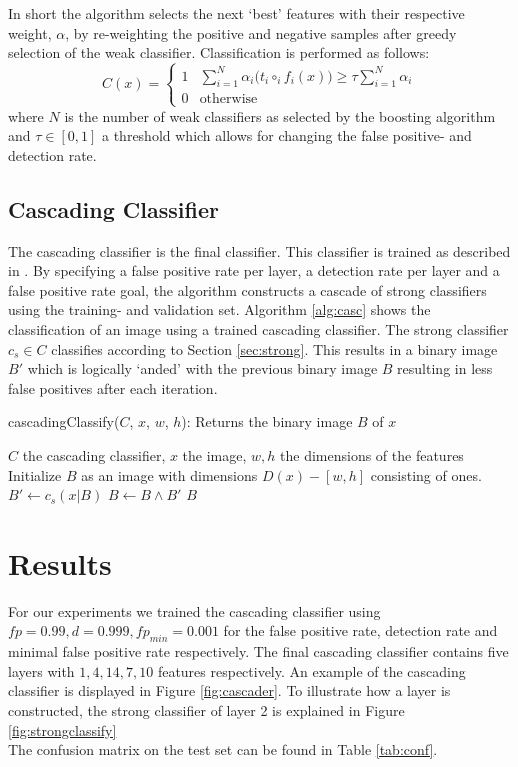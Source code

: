 \documentclass[a4paper,11pt]{article}
\begin{document}
In short the algorithm selects the next `best' features with their respective
weight, $\alpha$,  by re-weighting the positive and negative samples after
greedy selection of the weak classifier.
Classification is performed as follows:
\begin{displaymath}
C(x) = 
	\left\{ \begin{array}{ll}
		1 & \sum^N_{i=1} \alpha_i \big(t_i \circ_i f_i(x)\big) \ge \tau \sum^N_{i=1}\alpha_i \\
		0 & \textrm{otherwise}
	\end{array} \right.
\end{displaymath}
where $N$ is the number of weak classifiers as selected by the boosting
algorithm and $\tau \in [0,1]$ a threshold which allows for changing the false
positive- and detection rate.

\subsection{Cascading Classifier} \label{sec:casc}
The cascading classifier is the final classifier. This classifier is trained as
described in \cite{viola}. By specifying a false positive rate per layer, a
detection rate per layer and a false positive rate goal, the algorithm
constructs a cascade of strong classifiers using the training- and validation
set.  Algorithm \ref{alg:casc} shows the classification of an image using a
trained cascading classifier. The strong classifier $c_s \in C$ classifies
according to Section \ref{sec:strong}. This results in a binary image $B'$
which is logically `anded' with the previous binary image $B$ resulting in less
false positives after each iteration.
\begin{algorithm}[!htb]
	\caption{cascadingClassify($C$, $x$, $w$, $h$): Returns the binary image $B$ of $x$}
	\begin{algorithmic}[1]
	\REQUIRE $C$ the cascading classifier, $x$ the image, $w,h$ the dimensions of the features
	\medskip
	\STATE Initialize $B$ as an image with dimensions $D(x) - [w,h]$ consisting of ones.
		\STATE $B' \leftarrow c_s(x|B)$
		\STATE $B \leftarrow B \land B'$
	\ENDFOR
	\RETURN $B$
	\end{algorithmic}
\label{alg:casc}
\end{algorithm}

\section{Results} \label{sec:res}
For our experiments we trained the cascading classifier using $fp = 0.99, d =
0.999, fp_{min} = 0.001$ for the false positive rate, detection rate and
minimal false positive rate respectively. The final cascading classifier
contains five layers with $1, 4, 14, 7, 10$ features respectively. An example
of the cascading classifier is displayed in Figure \ref{fig:cascader}. To
illustrate how a layer is constructed, the strong classifier of layer 2 is
explained in Figure \ref{fig:strongclassify}\\
The confusion matrix on the test set can be found in Table \ref{tab:conf}. 
\end{document}
